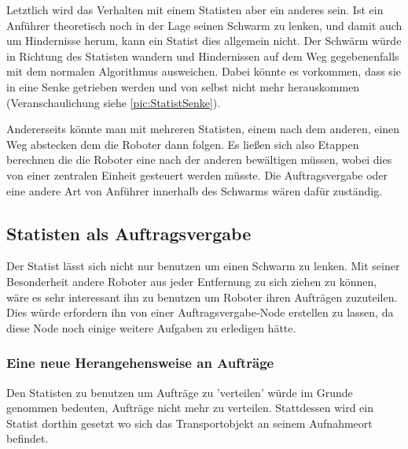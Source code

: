 Letztlich wird das Verhalten mit einem Statisten aber ein anderes sein. Ist ein Anführer theoretisch noch in der Lage seinen Schwarm zu lenken, und damit auch um Hindernisse herum, kann ein Statist dies allgemein nicht. Der Schwärm würde in Richtung des Statisten wandern und Hindernissen auf dem Weg gegebenenfalls mit dem normalen Algorithmus ausweichen. Dabei könnte es vorkommen, dass sie in eine Senke getrieben werden und von selbst nicht mehr herauskommen (Veranschaulichung siehe \autoref{pic:StatistSenke}).

Andererseits könnte man mit mehreren Statisten, einem nach dem anderen, einen Weg abstecken dem die Roboter dann folgen. Es ließen sich also Etappen berechnen die die Roboter eine nach der anderen bewältigen müssen, wobei dies von einer zentralen Einheit gesteuert werden müsste. Die Auftragsvergabe oder eine andere Art von Anführer innerhalb des Schwarms wären dafür zuständig.


\subsection{Statisten als Auftragsvergabe}

Der Statist lässt sich nicht nur benutzen um einen Schwarm zu lenken. Mit seiner Besonderheit andere Roboter aus jeder Entfernung zu sich ziehen zu können, wäre es sehr interessant ihn zu benutzen um Roboter ihren Aufträgen zuzuteilen. Dies würde erfordern ihn von einer Auftragsvergabe-Node erstellen zu lassen, da diese Node noch einige weitere Aufgaben zu erledigen hätte.

\subsubsection*{Eine neue Herangehensweise an Aufträge}

Den Statisten zu benutzen um Aufträge zu 'verteilen' würde im Grunde genommen bedeuten, Aufträge nicht mehr zu verteilen. Stattdessen wird ein Statist dorthin gesetzt wo sich das Transportobjekt an seinem Aufnahmeort befindet.

